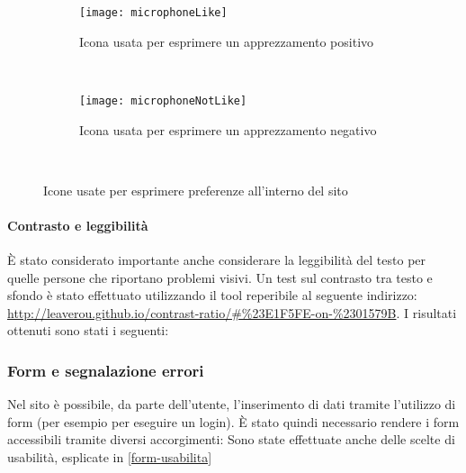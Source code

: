 \begin{figure}[H]
    \centering
    \begin{subfigure}[b]{0.4\textwidth}
        \texttt{[image: microphoneLike]}
        \caption{Icona usata per esprimere un apprezzamento positivo}
    \end{subfigure}
    ~
    \begin{subfigure}[b]{0.4\textwidth}
        \texttt{[image: microphoneNotLike]}
        \caption{Icona usata per esprimere un apprezzamento negativo}
    \end{subfigure}
    ~
    \caption{Icone usate per esprimere preferenze all'interno del sito}
\end{figure}

\paragraph*{Contrasto e leggibilit\`a}
\`E stato considerato importante anche considerare la leggibilit\`a del testo per quelle persone che riportano problemi visivi. Un test sul contrasto tra testo e sfondo \`e stato effettuato utilizzando il tool reperibile al seguente indirizzo: \url{http://leaverou.github.io/contrast-ratio/#\%23E1F5FE-on-\%2301579B}.
I risultati ottenuti sono stati i seguenti: %

\subsubsection{Form e segnalazione errori}
\label{form-accessibilita}
Nel sito è possibile, da parte dell'utente, l'inserimento di dati tramite l'utilizzo di form (per esempio per eseguire un login). È stato quindi necessario rendere i form accessibili tramite diversi accorgimenti: %
Sono state effettuate anche delle scelte di usabilità, esplicate in \ref{form-usabilita}
